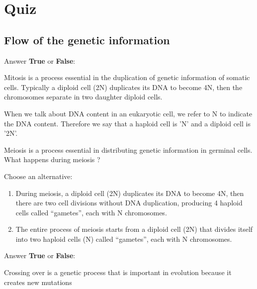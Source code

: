 \section{Quiz}

\subsection{Flow of the genetic information}

\begin{Exercise} [
  title={Mitosis},
  difficulty={1},
  label={ex7},
  origin={G. Valle}
 ]

Answer \textbf{True} or \textbf{False}:

  \Question Mitosis is a process essential in the duplication of genetic
information of somatic cells.
Typically a diploid cell (2N) duplicates its DNA to become 4N, then the
chromosomes separate in two daughter diploid cells.

\end{Exercise}

\begin{Exercise} [
  title={Meiosis},
  difficulty={1},
  label={ex8},
  origin={G. Valle}
 ]

  \Question When we talk about DNA content in an eukaryotic cell, we refer to
N to indicate the DNA content.
Therefore we say that a haploid cell is 'N' and a diploid cell is '2N'.

Meiosis is a process essential in distributing genetic information in germinal
cells. What happens during  meiosis ?

Choose an alternative:

\begin{enumerate}
  \item During meiosis,  a diploid cell (2N) duplicates its DNA to become 4N,
then there are two cell divisions without DNA duplication, producing 4 haploid
cells called “gametes”, each with N chromosomes.
  \item The entire process of meiosis starts from a diploid cell (2N) that
divides itself into two haploid cells (N) called “gametes”, each with N
chromosomes.
\end{enumerate}

\end{Exercise}

\begin{Exercise} [
  title={Crossing-Over (1)},
  difficulty={1},
  label={ex9},
  origin={G. Valle}
 ]

Answer \textbf{True} or \textbf{False}:

  \Question Crossing over is a genetic process that is important in evolution
because it creates new mutations

\end{Exercise}


